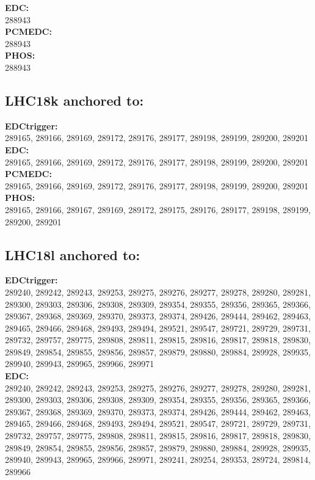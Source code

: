  \textbf{EDC:}\\
 288943\\

 \textbf{PCMEDC:}\\
288943\\

 \textbf{PHOS:}\\
288943\\

 \subsection{LHC18k anchored to:  }

 \textbf{EDCtrigger:}\\
 289165, 289166, 289169, 289172, 289176, 289177, 289198, 289199, 289200, 289201\\

 \textbf{EDC:}\\
 289165, 289166, 289169, 289172, 289176, 289177, 289198, 289199, 289200, 289201\\

 \textbf{PCMEDC:}\\
289165, 289166, 289169, 289172, 289176, 289177, 289198, 289199, 289200, 289201  \\

 \textbf{PHOS:}\\
289165, 289166, 289167, 289169, 289172, 289175, 289176, 289177, 289198, 289199, 289200, 289201\\

 \subsection{LHC18l anchored to:  }

 \textbf{EDCtrigger:}\\
 289240, 289242, 289243, 289253, 289275, 289276, 289277, 289278, 289280, 289281, 289300, 289303, 289306, 289308, 289309, 289354, 289355, 289356, 289365, 289366, 289367, 289368, 289369, 289370, 289373, 289374, 289426, 289444, 289462, 289463, 289465, 289466, 289468, 289493, 289494, 289521, 289547, 289721, 289729, 289731, 289732, 289757, 289775, 289808, 289811, 289815, 289816, 289817, 289818, 289830, 289849, 289854, 289855, 289856, 289857, 289879, 289880, 289884, 289928, 289935, 289940, 289943, 289965, 289966, 289971 \\

 \textbf{EDC:}\\
 289240, 289242, 289243, 289253, 289275, 289276, 289277, 289278, 289280, 289281, 289300, 289303, 289306, 289308, 289309, 289354, 289355, 289356, 289365, 289366, 289367, 289368, 289369, 289370, 289373, 289374, 289426, 289444, 289462, 289463, 289465, 289466, 289468, 289493, 289494, 289521, 289547, 289721, 289729, 289731, 289732, 289757, 289775, 289808, 289811, 289815, 289816, 289817, 289818, 289830, 289849, 289854, 289855, 289856, 289857, 289879, 289880, 289884, 289928, 289935, 289940, 289943, 289965, 289966, 289971, 289241, 289254, 289353, 289724, 289814, 289966\\

